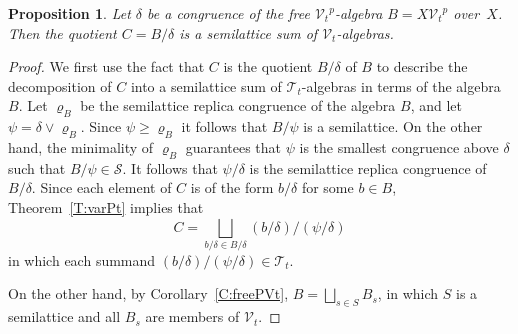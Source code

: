 \documentclass{birkau}
\newcommand{\mcV}{\mathcal{V}}
\newcommand{\mcT}{\mathcal{T}}
\newcommand{\mcS}{\mathcal{S}}
\newcommand{\pro}[1]{{#1}^p}
\theoremstyle{plain}
\newtheorem{proposition}[theorem]{Proposition}
\theoremstyle{definition}
\numberwithin{equation}{section}
\begin{document}
\begin{proposition}\label{P:quotientC}
  Let $\delta$ be a congruence of the free $\pro{\mcV_{t}}$-algebra $B = X\pro{\mcV_t}$
  over~$X$. Then the quotient $C = B/\delta$ is a semilattice sum of $\mcV_t$-algebras.
\end{proposition}
\begin{proof}
We first use the fact that $C$ is the quotient $B/\delta$ of $B$ to describe the
decomposition of $C$ into a semilattice sum of $\mcT_t$-algebras in terms of
the algebra $B$.
Let $\varrho_B$ be the semilattice replica congruence of the algebra $B$, and let
$\psi = \delta \vee \varrho_B$. Since $\psi \geq \varrho_B$ it follows that $B/\psi$ is a
semilattice. On the other hand, the minimality of $\varrho_B$ guarantees that $\psi$ is
the smallest congruence above $\delta$ such that $B/\psi \in \mcS$. It follows that
$\psi/\delta$ is the semilattice replica congruence of $B/\delta$.
Since each element of $C$ is of the form $b/\delta$ for some $b\in B$,
Theorem~\ref{T:varPt} implies that
\begin{equation*}
  C = \bigsqcup_{b/\delta\in B/\delta} (b/\delta)/(\psi/\delta)
\end{equation*}
in which each summand $(b/\delta)/(\psi/\delta) \in \mcT_t$.


On the other hand, by Corollary~\ref{C:freePVt}, $B = \bigsqcup_{s \in S} B_s $, in which
$S$ is a semilattice and all $B_s$ are members of $\mcV_t$.


\end{proof}
\end{document}

